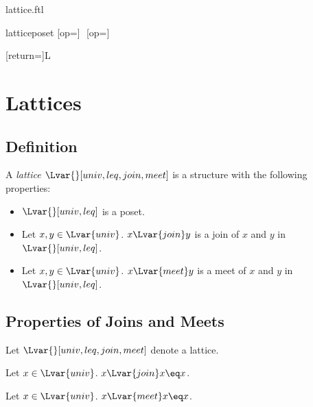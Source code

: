 \documentclass{naproche-library}
\begin{document}
\begin{smodule}{lattice.ftl}


\begin{extstructure}{lattice}{poset}
  [op=\vee]{\,\vee\,}
  [op=\wedge]{\,\wedge\,}
\end{extstructure}

[return={\lattice[comp=##1]}]{\mathcal L}

\section{Lattices}

\subsection{Definition}

\begin{signature*}[forthel,id=LatticeSig]
  A \emph{lattice $\Lvar{}[univ,leq,join,meet]$} is a structure with the following properties:
  
  \begin{itemize}
    \item\label{latticeSig}
      $\Lvar{}[univ,leq]$ is a poset.
    \item\label{latticeJoinSig}
      Let $x,y\in\Lvar{univ}$.
      $x{\Lvar{join}}y$ is a join of $x$ and $y$ in $\Lvar{}[univ,leq]$.
    \item\label{latticeMeetSig}
      Let $x,y\in\Lvar{univ}$.
      $x{\Lvar{meet}}y$ is a meet of $x$ and $y$ in $\Lvar{}[univ,leq]$.
  \end{itemize}
\end{signature*}

\subsection{Properties of Joins and Meets}

\begin{forthel}
  Let $\Lvar{}[univ,leq,join,meet]$ denote a lattice.
\end{forthel}

\begin{proposition*}[forthel,id=JoinIdempotenceThm]
  Let $x\in\Lvar{univ}$.
  $x{\Lvar{join}}x\eq x$.
\end{proposition*}

\begin{proposition*}[forthel,id=MeetIdempotenceThm]
  Let $x\in\Lvar{univ}$.
  $x{\Lvar{meet}}x\eq x$.
\end{proposition*}


\end{smodule}
\end{document}
